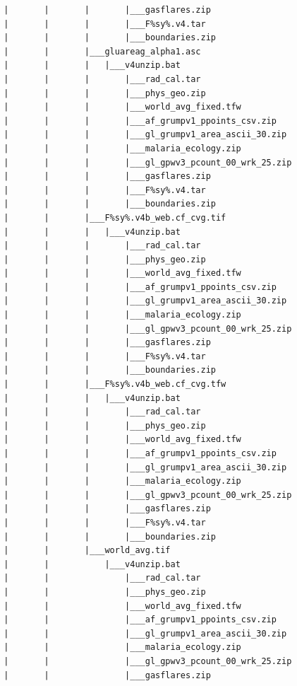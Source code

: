 \documentclass[]{book}
\begin{document}
\begin{verbatim}
        |       |       |       |___gasflares.zip
        |       |       |       |___F%sy%.v4.tar
        |       |       |       |___boundaries.zip
        |       |       |___gluareag_alpha1.asc
        |       |       |   |___v4unzip.bat
        |       |       |       |___rad_cal.tar
        |       |       |       |___phys_geo.zip
        |       |       |       |___world_avg_fixed.tfw
        |       |       |       |___af_grumpv1_ppoints_csv.zip
        |       |       |       |___gl_grumpv1_area_ascii_30.zip
        |       |       |       |___malaria_ecology.zip
        |       |       |       |___gl_gpwv3_pcount_00_wrk_25.zip
        |       |       |       |___gasflares.zip
        |       |       |       |___F%sy%.v4.tar
        |       |       |       |___boundaries.zip
        |       |       |___F%sy%.v4b_web.cf_cvg.tif
        |       |       |   |___v4unzip.bat
        |       |       |       |___rad_cal.tar
        |       |       |       |___phys_geo.zip
        |       |       |       |___world_avg_fixed.tfw
        |       |       |       |___af_grumpv1_ppoints_csv.zip
        |       |       |       |___gl_grumpv1_area_ascii_30.zip
        |       |       |       |___malaria_ecology.zip
        |       |       |       |___gl_gpwv3_pcount_00_wrk_25.zip
        |       |       |       |___gasflares.zip
        |       |       |       |___F%sy%.v4.tar
        |       |       |       |___boundaries.zip
        |       |       |___F%sy%.v4b_web.cf_cvg.tfw
        |       |       |   |___v4unzip.bat
        |       |       |       |___rad_cal.tar
        |       |       |       |___phys_geo.zip
        |       |       |       |___world_avg_fixed.tfw
        |       |       |       |___af_grumpv1_ppoints_csv.zip
        |       |       |       |___gl_grumpv1_area_ascii_30.zip
        |       |       |       |___malaria_ecology.zip
        |       |       |       |___gl_gpwv3_pcount_00_wrk_25.zip
        |       |       |       |___gasflares.zip
        |       |       |       |___F%sy%.v4.tar
        |       |       |       |___boundaries.zip
        |       |       |___world_avg.tif
        |       |           |___v4unzip.bat
        |       |               |___rad_cal.tar
        |       |               |___phys_geo.zip
        |       |               |___world_avg_fixed.tfw
        |       |               |___af_grumpv1_ppoints_csv.zip
        |       |               |___gl_grumpv1_area_ascii_30.zip
        |       |               |___malaria_ecology.zip
        |       |               |___gl_gpwv3_pcount_00_wrk_25.zip
        |       |               |___gasflares.zip

\end{verbatim}
\end{document}

